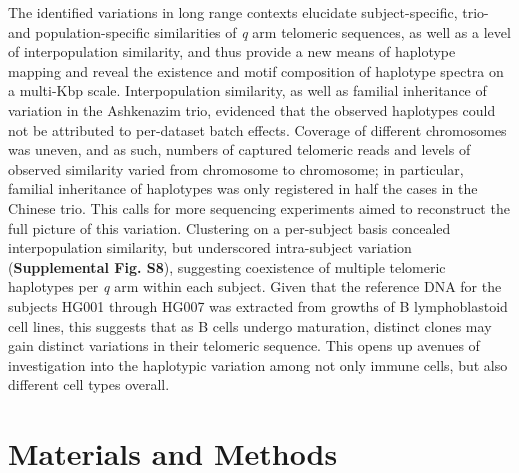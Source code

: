 \documentclass{article}
\begin{document}
    The identified variations in long range contexts elucidate
        subject-specific, trio- and population-specific similarities of \textit{q} arm telomeric sequences,
            as well as a level of interpopulation similarity,
        and thus provide a new means of haplotype mapping and reveal the existence and motif composition of haplotype spectra
            on a multi-Kbp scale.
    Interpopulation similarity, as well as familial inheritance of variation in the Ashkenazim trio,
        evidenced that the observed haplotypes could not be attributed to per-dataset batch effects.
    Coverage of different chromosomes was uneven,
        and as such, numbers of captured telomeric reads and levels of observed similarity varied from chromosome to chromosome;
        in particular, familial inheritance of haplotypes was only registered in half the cases in the Chinese trio.
        This calls for more sequencing experiments aimed to reconstruct the full picture of this variation.
    Clustering on a per-subject basis concealed interpopulation similarity,
        but underscored intra-subject variation (\textbf{Supplemental Fig. S8}),
            suggesting coexistence of multiple telomeric haplotypes per \textit{q} arm within each subject.
        Given that the reference DNA for the subjects HG001 through HG007
            was extracted from growths of B lymphoblastoid cell lines,
            this suggests that as B cells undergo maturation,
                distinct clones may gain distinct variations in their telomeric sequence.
        This opens up avenues of investigation into the haplotypic variation among not only immune cells,
            but also different cell types overall.

\section*{Materials and Methods}  \label{sec:methods}
\end{document}
